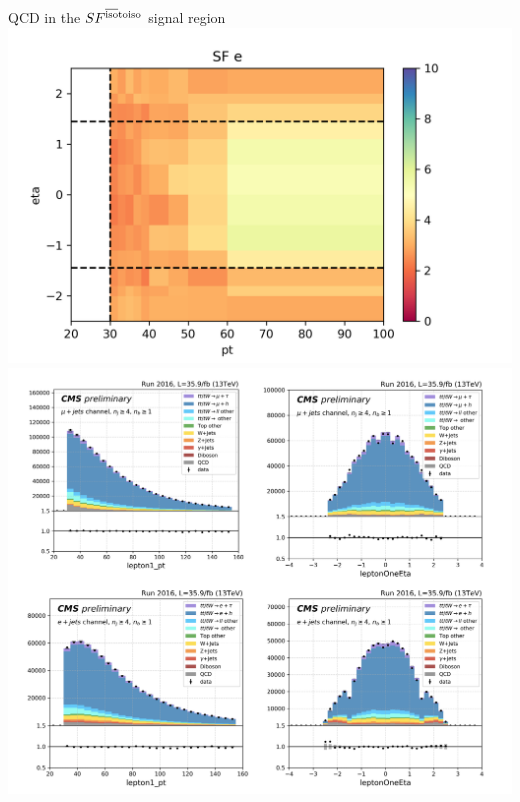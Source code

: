 \begin{frame}{}
    \begin{exampleblock}{QCD in the \ceh}
    \hspace{0.12\textwidth} $SF^{\rm \overline{iso} \to iso}$ \hspace{0.3\textwidth} signal region \\
    \centering
        \includegraphics[height=0.32\textheight]{chapters/Analysis/sectionBackground/figures/ljets_kinematics/123j1b/SF_e_2d.png}
        \includegraphics[height=0.32\textheight, trim=0 0 0 11.2cm, clip]{chapters/Analysis/sectionBackground/figures/ljets_application/mcNorm_ddShape.png}
    \end{exampleblock}

\end{frame}


